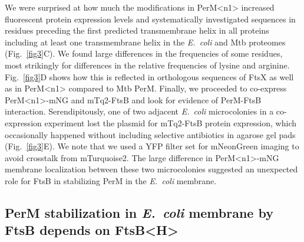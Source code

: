 \documentclass[pdflatex,sn-nature]{sn-jnl}%
\def\textsuperscript#1{<#1>}%
\newcommand\ec{\textit{E.~coli}}
\newcommand\mtb{Mtb}
\newcommand\ftsbH{FtsB\textsuperscript{H}}
\newcommand\permN{PerM\textsuperscript{n1}}
\begin{document}
We were surprised at how much the modifications in \permN{} increased fluorescent protein expression levels and systematically investigated sequences in residues preceding the first predicted transmembrane helix in all proteins including at least one transmembrane helix in the \ec{} and \mtb{} proteomes (Fig.~\ref{fig3}C).
We found large differences in the frequencies of some residues, most strikingly for differences in the relative frequencies of lysine and arginine. Fig.~\ref{fig3}D shows how this is reflected in orthologous sequences of FtsX as well as in \permN{} compared to \mtb{} PerM.
Finally, we proceeded to co-express \permN{}-mNG and mTq2-FtsB and look for evidence of PerM-FtsB interaction.
Serendipitously, one of two adjacent \ec{} microcolonies in a co-expression experiment lost the plasmid for mTq2-FtsB protein expression, which occasionally happened without including selective antibiotics in agarose gel pads (Fig.~\ref{fig3}E). We note that we used a YFP filter set for mNeonGreen imaging to avoid crosstalk from mTurquoise2.
The large difference in \permN{}-mNG membrane localization between these two microcolonies suggested an unexpected role for FtsB in stabilizing PerM in the \ec{} membrane.

\subsection{PerM stabilization in \ec{} membrane by FtsB depends on \ftsbH{}}
\end{document}
